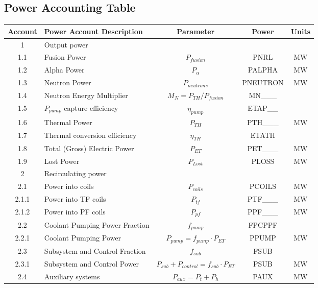 \newpage
\subsection{Power Accounting Table}

\begin{table}[ht!]								
\centering								
\begin{tabular}{|c|p{5cm}|c|c|c|}								
\hline								
\textbf{Account}	&	\textbf{Power Account Description}	&	\textbf{Parameter }	&	\textbf{Power}	&	\textbf{Units} \\
\hline								
1	&	Output power	&		&		&	\\
\hline
1.1	&	Fusion Power	&	$P_{{fusion}}$	&	PNRL	&	MW \\
1.2	&	Alpha Power	&	$P_{{\alpha}}$	&	PALPHA	&	MW \\
1.3	&	Neutron Power	&	$P_{{neutrons}}$	&	PNEUTRON	&	MW \\
1.4	&	Neutron Energy Multiplier	&	$M_N = P_{{TH}}/P_{{fusion}}$	&	MN___	&	\\
1.5	&	$P_{pump}$ capture efficiency	&	$\eta_{{pump}}$	&	ETAP__	&	\\
1.6	&	Thermal Power	&	$P_{{TH}}$	&	PTH___	&	MW \\
1.7	&	Thermal conversion efficiency	&	$\eta_{{TH}}$	&	ETATH	&	\\
1.8	&	Total (Gross) Electric Power	&	$P_{{ET}}$	&	PET___	&	MW \\
1.9	&	Lost Power	&	$P_{{Lost}}$	&	PLOSS	&	MW \\
\hline								
2	&	Recirculating power	&		&		&	\\
\hline
2.1	&	Power into coils 	&	$P_{coils}$ &	PCOILS	&	MW \\
2.1.1	&	Power into TF coils	&	$P_{tf}$	&	PTF___	&	MW \\
2.1.2	&	Power into PF coils	&	$P_{pf}$	&	PPF___		&	MW \\
2.2	&	Coolant Pumping Power Fraction	&	$f_{{pump}}$	&	FPCPPF &	\\
2.2.1	&	Coolant Pumping Power	&	$P_{{pump}} = f_{{pump}} \cdot P_{{ET}}$	&	PPUMP	&	MW \\
2.3	&	Subsystem and Control Fraction	&	$f_{{sub}}$	&	FSUB	&	\\
2.3.1	&	Subsystem and Control Power	&	$P_{{sub}} + P_{{control}} = f_{{sub}} \cdot P_{{ET}}$	&	PSUB	&	MW \\
2.4	&	Auxiliary systems	&	$P_{{aux}} = P_{{t}} + P_{{h}}$	&	PAUX	&	MW \\

\end{tabular}
\end{table}
